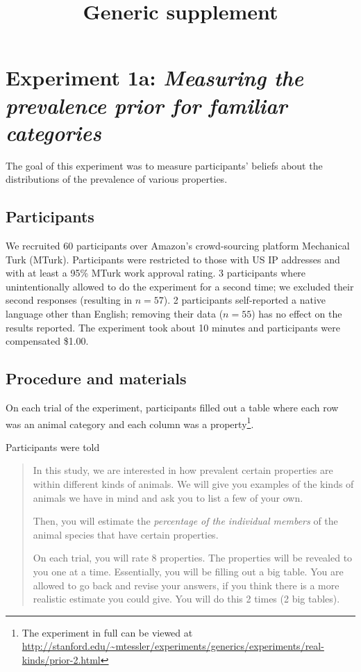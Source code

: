 \documentclass[10pt,letterpaper]{article}
\title{Generic supplement}
\begin{document}
\maketitle



\appendix


\section{Experiment 1a: \emph{Measuring the prevalence prior for familiar categories}}

The goal of this experiment was to measure participants' beliefs about the distributions of the prevalence of various properties.

\subsection{Participants}

We recruited 60 participants over Amazon's crowd-sourcing platform Mechanical Turk (MTurk).  Participants were restricted to those with US IP addresses and with at least a 95\% MTurk work approval rating. 
3 participants where unintentionally allowed to do the experiment for a second time; we excluded their second responses (resulting in $n=57$).
2 participants self-reported a native language other than English; removing their data ($n=55$) has no effect on the results reported. 
The experiment took about 10 minutes and participants were compensated \$1.00.

\subsection{Procedure and materials}

On each trial of the experiment, participants filled out a table where each row was an animal category and each column was a property\footnote{The experiment in full can be viewed at \url{http://stanford.edu/~mtessler/experiments/generics/experiments/real-kinds/prior-2.html}}.

Participants were told 
\begin{quote}
In this study, we are interested in how prevalent certain properties are within different kinds of animals. We will give you examples of the kinds of animals we have in mind and ask you to list a few of your own.

Then, you will estimate the \emph{percentage of the individual members} of the animal species that have certain properties.

On each trial, you will rate 8 properties. The properties will be revealed to you one at a time. Essentially, you will be filling out a big table. You are allowed to go back and revise your answers, if you think there is a more realistic estimate you could give. You will do this 2 times (2 big tables). 

\end{quote}
\end{document}
